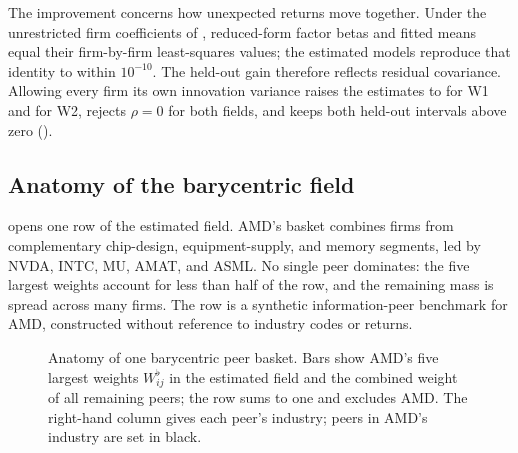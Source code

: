 The improvement concerns how unexpected returns move together.
Under the unrestricted firm coefficients of
, reduced-form factor betas and fitted means
equal their firm-by-firm least-squares values; the estimated models reproduce
that identity to within $10^{-10}$.
The held-out gain therefore reflects residual covariance.
Allowing every firm its own innovation variance raises the estimates to
 for W1 and
 for W2, rejects $\rho=0$ for both
fields, and keeps both held-out intervals above zero
().

\subsection{Anatomy of the barycentric field}
\label{sec:results-anatomy}

 opens one row of the estimated field.
AMD's basket combines firms from complementary chip-design, equipment-supply,
and memory segments, led by NVDA, INTC, MU, AMAT, and ASML.
No single peer dominates: the five largest weights account for less than half
of the row, and the remaining mass is spread across many firms.
The row is a synthetic information-peer benchmark for AMD, constructed without
reference to industry codes or returns.

\begin{figure}[htbp]
  \centering
  \caption{Anatomy of one barycentric peer basket. Bars show AMD's five largest
    weights $W^\flat_{ij}$ in the estimated field and the combined weight of
    all remaining peers; the row sums to one and excludes AMD. The right-hand
    column gives
  each peer's industry; peers in AMD's industry are set in black.}
  \label{fig:peer-basket}
\end{figure}

